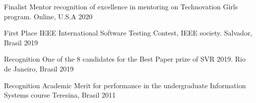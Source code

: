 



\begin{cvhonors}
  \cvhonor
    {Finalist} %
    {Mentor recognition of excellence in mentoring on Technovation Girls program.} %
    {Online, U.S.A} %
    {2020} %



  \cvhonor
    {First Place} %
    {IEEE International Software Testing Contest, IEEE society.} %
    {Salvador, Brasil} %
    {2019} %


\end{cvhonors}




\begin{cvhonors}
  \cvhonor
    {Recognition} %
    {One of the 8 candidates for the Best Paper prize of SVR 2019.} %
    {Rio de Janeiro, Brasil} %
    {2019} %

  \cvhonor
    {Recognition} %
    {Academic Merit for performance in the undergraduate Information Systems course} %
    {Teresina, Brasil} %
    {2011} %

\end{cvhonors}
